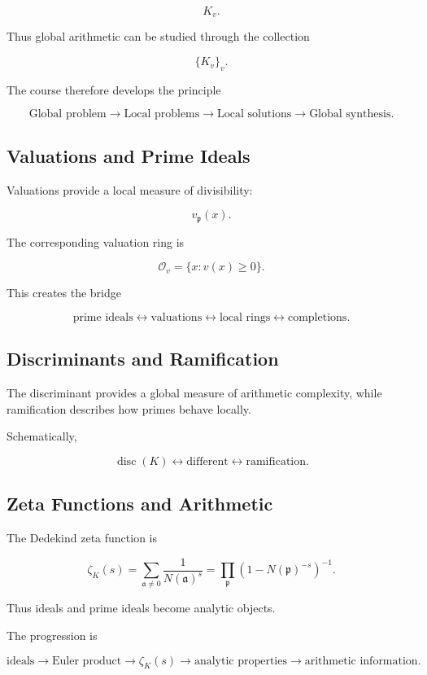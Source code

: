 \documentclass[11pt,a4paper]{article}
\newcommand{\disc}{\operatorname{disc}}
\begin{document}
\[
K_v.
\]

Thus global arithmetic can be studied through the collection

\[
\{K_v\}_v.
\]

The course therefore develops the principle

\[
\boxed{
\text{Global problem}
\longrightarrow
\text{Local problems}
\longrightarrow
\text{Local solutions}
\longrightarrow
\text{Global synthesis}.
}
\]

\subsection{Valuations and Prime Ideals}

Valuations provide a local measure of divisibility:

\[
v_{\mathfrak p}(x).
\]

The corresponding valuation ring is

\[
\mathcal O_v
=
\{x : v(x)\geq 0\}.
\]

This creates the bridge

\[
\text{prime ideals}
\leftrightarrow
\text{valuations}
\leftrightarrow
\text{local rings}
\leftrightarrow
\text{completions}.
\]

\subsection{Discriminants and Ramification}

The discriminant provides a global measure of arithmetic
complexity, while ramification describes how primes behave locally.

Schematically,

\[
\disc(K)
\longleftrightarrow
\text{different}
\longleftrightarrow
\text{ramification}.
\]

\subsection{Zeta Functions and Arithmetic}

The Dedekind zeta function is

\[
\zeta_K(s)
=
\sum_{\mathfrak a\neq 0}
\frac{1}{N(\mathfrak a)^s}
=
\prod_{\mathfrak p}
\left(1-N(\mathfrak p)^{-s}\right)^{-1}.
\]

Thus ideals and prime ideals become analytic objects.

The progression is

\[
\text{ideals}
\rightarrow
\text{Euler product}
\rightarrow
\zeta_K(s)
\rightarrow
\text{analytic properties}
\rightarrow
\text{arithmetic information}.
\]
\end{document}
